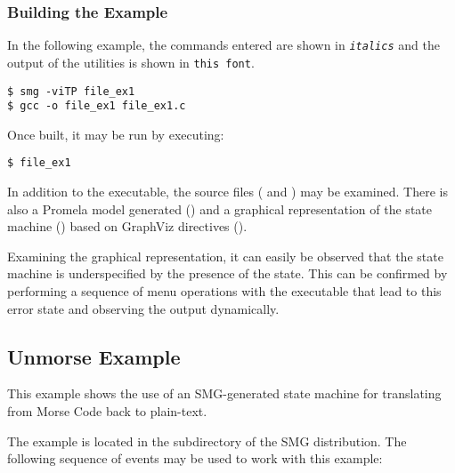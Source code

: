 \hypertarget{filex1smg}{\subsubsection{Building the Example}}

In the following example, the commands entered are shown in {\tt\it italics} and the output of the utilities is shown in {\tt this font}.
\begin{verbatim}
$ smg -viTP file_ex1
$ gcc -o file_ex1 file_ex1.c
\end{verbatim}

Once built, it may be run by executing:

\begin{verbatim}
$ file_ex1
\end{verbatim}

In addition to the executable, the source files ( and
) may be examined.  There is also a Promela
model generated () and a graphical representation
of the state machine
(\href{Examples/file_ex1/file_ex1S.ps}{}) based on
GraphViz directives ().

Examining the graphical representation, it can easily be observed that
the state machine is underspecified by the presence of the
 state.  This can be confirmed by
performing a sequence of menu operations with the executable that lead
to this error state and observing the output dynamically.



\subsection{Unmorse Example}

This example shows the use of an SMG-generated state machine for
translating from Morse Code back to plain-text.

The example is located in the  subdirectory of
the SMG distribution.  The following sequence of events may be used to
work with this example:

